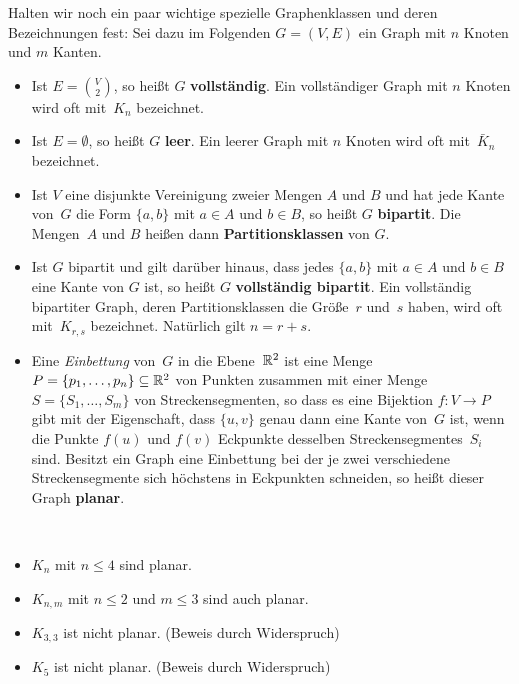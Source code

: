 \begin{defn} 
Halten wir noch ein paar wichtige spezielle Graphenklassen und deren Bezeichnungen fest: Sei dazu im Folgenden $G=(V,E)$ ein Graph mit $n$ Knoten und $m$ Kanten.
\begin{itemize}
 \item Ist $E=\binom{V}{2}$, so heißt $G$ \textbf{vollständig}.
 Ein vollständiger Graph mit $n$ Knoten wird oft mit~$K_n$ bezeichnet.

 \item Ist $E=\emptyset$, so heißt $G$ \textbf{leer}.
 Ein leerer Graph mit $n$ Knoten wird oft mit~$\bar K_n$ bezeichnet.

 \item Ist $V$ eine disjunkte Vereinigung zweier Mengen $A$ und $B$ und hat jede Kante von~$G$ die Form $\{a,b\}$ mit $a \in A$ und $b \in B$, so heißt $G$ \textbf{bipartit}.
 Die Mengen~$A$ und $B$ heißen dann \textbf{Partitionsklassen} von $G$.
 
 \item Ist $G$ bipartit und gilt darüber hinaus, dass jedes $\{a,b\}$ mit $a \in A$ und $b \in B$ eine Kante von $G$ ist, so heißt $G$ \textbf{vollständig bipartit}.
 Ein vollständig bipartiter Graph, deren Partitionsklassen die Größe~$r$ und~$s$ haben, wird oft mit~$K_{r,s}$ bezeichnet.
 Natürlich gilt $n = r + s$.
 
 \item Eine \emph{Einbettung} von~$G$ in die Ebene~$\mathbb{R}^2$ ist eine Menge $P=\{p_1,\ldots,p_n\} \subseteq \mathbb{R}^2$ von Punkten zusammen mit einer Menge $S=\{S_1,\ldots,S_m\}$ von Streckensegmenten, so dass es eine Bijektion $f:V \to P$ gibt mit der Eigenschaft, dass $\{u,v\}$ genau dann eine Kante von~$G$ ist, wenn die Punkte $f(u)$ und $f(v)$ Eckpunkte desselben Streckensegmentes~$S_i$ sind.
 Besitzt ein Graph eine Einbettung bei der je zwei verschiedene Streckensegmente sich höchstens in Eckpunkten schneiden, so heißt dieser Graph \textbf{planar}.
 \end{itemize}
\end{defn} 

\begin{bsp}\
	\begin{itemize} 
	\item  $K_n$ mit $n\leq4$ sind planar. 
	 \item $K_{n,m}$ mit $n \le 2$ und $m \le 3$ sind auch planar. 
	 \item $K_{3,3}$ ist nicht planar. (Beweis durch Widerspruch)
	 \item $K_5$ ist nicht planar. (Beweis durch Widerspruch) 
	 \end{itemize} 
\end{bsp} 

